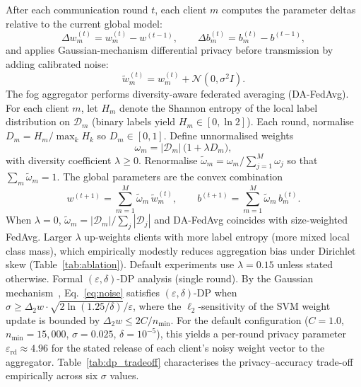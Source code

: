 \documentclass[sensors,article,submit,pdftex,moreauthors]{Definitions/mdpi}
\begin{document}
After each communication round $t$, each client $m$ computes the parameter deltas relative to the current global model:
\begin{equation}
\Delta w_m^{(t)} = w_m^{(t)} - w^{(t-1)}, \qquad \Delta b_m^{(t)} = b_m^{(t)} - b^{(t-1)},
\label{eq:delta}
\end{equation}
and applies Gaussian-mechanism differential privacy before transmission by adding calibrated noise:
\begin{equation}
\tilde{w}_m^{(t)} = w_m^{(t)} + \mathcal{N}(0,\sigma^2 I).
\label{eq:noise}
\end{equation}
The fog aggregator performs diversity-aware federated averaging (DA-FedAvg). For each client $m$, let $H_m$ denote the Shannon entropy of the local label distribution on $\mathcal{D}_m$ (binary labels yield $H_m \in [0,\ln 2]$). Each round, normalise $D_m = H_m / \max_{k} H_k$ so $D_m \in [0,1]$. Define unnormalised weights
\begin{equation}
\omega_m = |\mathcal{D}_m|\,\bigl(1 + \lambda D_m\bigr),
\label{eq:dafedavg_omega}
\end{equation}
with diversity coefficient $\lambda \ge 0$. Renormalise $\tilde{\omega}_m = \omega_m / \sum_{j=1}^{M}\omega_j$ so that $\sum_m \tilde{\omega}_m = 1$. The global parameters are the convex combination
\begin{equation}
w^{(t+1)} = \sum_{m=1}^{M}\tilde{\omega}_m\,\tilde{w}_m^{(t)},
\qquad
b^{(t+1)} = \sum_{m=1}^{M}\tilde{\omega}_m\,b_m^{(t)}.
\label{eq:fedavg}
\end{equation}
When $\lambda{=}0$, $\tilde{\omega}_m = |\mathcal{D}_m|/\sum_j|\mathcal{D}_j|$ and DA-FedAvg coincides with size-weighted FedAvg. Larger $\lambda$ up-weights clients with more label entropy (more mixed local class mass), which empirically modestly reduces aggregation bias under Dirichlet skew (Table~\ref{tab:ablation}). Default experiments use $\lambda{=}0.15$ unless stated otherwise. Formal $(\varepsilon,\delta)$-DP analysis (single round). By the Gaussian mechanism~\cite{dwork2014algorithmic}, Eq.~\eqref{eq:noise} satisfies $(\varepsilon,\delta)$-DP when $\sigma \ge \Delta_2 w \cdot \sqrt{2\ln(1.25/\delta)}/\varepsilon$, where the $\ell_2$-sensitivity of the SVM weight update is bounded by $\Delta_2 w \le 2C/n_{\min}$. For the default configuration ($C{=}1.0$, $n_{\min}{=}15{,}000$, $\sigma{=}0.025$, $\delta{=}10^{-5}$), this yields a per-round privacy parameter $\varepsilon_{\mathrm{rd}} \approx 4.96$ for the stated release of each client's noisy weight vector to the aggregator. Table~\ref{tab:dp_tradeoff} characterises the privacy--accuracy trade-off empirically across six $\sigma$ values.
\end{document}
